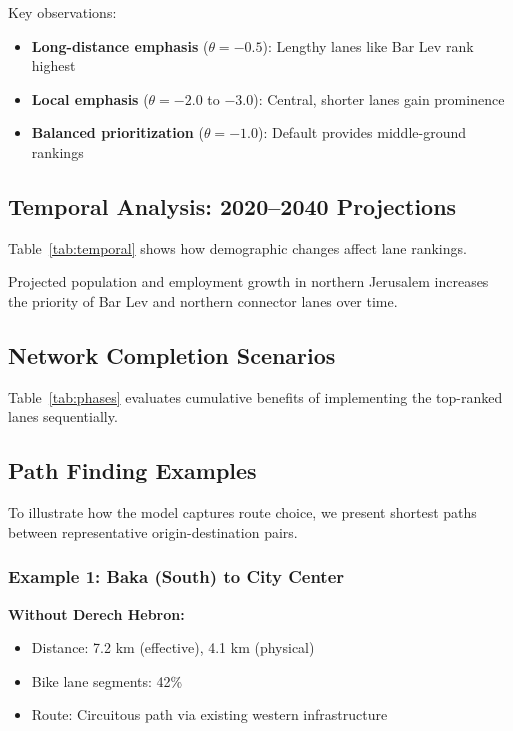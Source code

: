 \documentclass[12pt,a4paper]{article}
\begin{document}
Key observations:
\begin{itemize}
    \item \textbf{Long-distance emphasis} ($\theta=-0.5$): Lengthy lanes like Bar Lev rank highest
    \item \textbf{Local emphasis} ($\theta=-2.0$ to $-3.0$): Central, shorter lanes gain prominence
    \item \textbf{Balanced prioritization} ($\theta=-1.0$): Default provides middle-ground rankings
\end{itemize}

\subsection{Temporal Analysis: 2020--2040 Projections}

Table~\ref{tab:temporal} shows how demographic changes affect lane rankings.



Projected population and employment growth in northern Jerusalem increases the priority of Bar Lev and northern connector lanes over time.

\subsection{Network Completion Scenarios}

Table~\ref{tab:phases} evaluates cumulative benefits of implementing the top-ranked lanes sequentially.



\subsection{Path Finding Examples}

To illustrate how the model captures route choice, we present shortest paths between representative origin-destination pairs.

\subsubsection{Example 1: Baka (South) to City Center}

\textbf{Without Derech Hebron:}
\begin{itemize}
    \item Distance: 7.2 km (effective), 4.1 km (physical)
    \item Bike lane segments: 42\%
    \item Route: Circuitous path via existing western infrastructure
\end{itemize}
\end{document}
